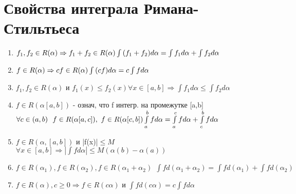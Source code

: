 \section{Свойства интеграла Римана-Стильтьеса}
\begin{enumerate}
	\item $f_{1},f_{2} \in R(\alpha)\Rightarrow f_{1}+f_{2} \in R(\alpha) \\
	\int{(f_{1}+f_{2})}d\alpha=\int{f_{1}}d\alpha+\int{f_{2}}d\alpha$
	\item $f\in R(\alpha) \Rightarrow cf \in R(\alpha) \\
	\int{(cf)}d\alpha = c\int{f}d\alpha$
	\item $f_{1},f_{2}\in R(\alpha)$ и $f_{1}(x)\leq f_{2}(x) \forall x \in [a,b] \Rightarrow \int{f_{1}}d\alpha \leq \int{f_{2}}d\alpha$
	\item $f \in R(\alpha[a,b])$ - означ, что f интегр. на промежутке [a,b] $\forall c \in (a,b) \ \ f\in R(\alpha[a,c]), \ f\in R(\alpha[c,b]) \\
	\int\limits_{a}^{b}{f}d\alpha = \int\limits_{a}^{c}{f}d\alpha + \int\limits_{c}^{b}{f}d\alpha$
	\item $f \in R(\alpha,[a,b])$ и |f(x)|$\leq M$ $\forall x\in [a,b] \Rightarrow |\int{f}d\alpha|\leq M(\alpha(b)-\alpha(a))$
	\item $f \in R(\alpha_{1}), f\in R(\alpha_{2}), f \in R(\alpha_{1}+\alpha_{2}) \ \ \int{f}d(\alpha_{1}+\alpha_{2}) = \int{f}d(\alpha_{1})+\int{f}d(\alpha_{2})$
	\item $f \in R(\alpha), c\geq 0 \Rightarrow f\in R(c\alpha)$ и $\int{f}d(c\alpha)=c\int{f}d\alpha$
\end{enumerate}

